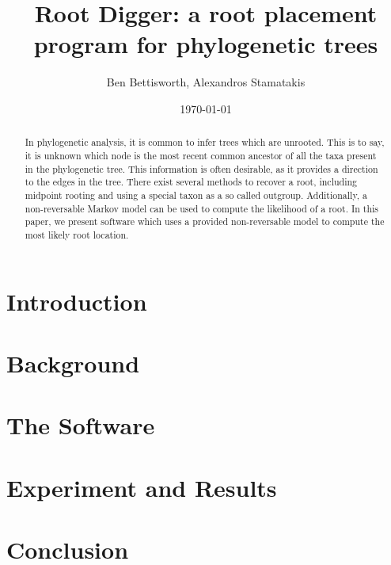 \documentclass{article}
\title{Root Digger: a root placement program for phylogenetic trees}
\author{Ben Bettisworth, Alexandros Stamatakis}
\date{\today}
\begin{document}
\begin{abstract}
In phylogenetic analysis, it is common to infer trees which are unrooted. This
is to say, it is unknown which node is the most recent common ancestor of all
the taxa present in the phylogenetic tree. This information is often desirable,
as it provides a direction to the edges in the tree.  There exist several
methods to recover a root, including midpoint rooting and using a special taxon
as a so called outgroup. Additionally, a non-reversable Markov model can be used
to compute the likelihood of a root. In this paper, we present software which
uses a provided non-reversable model to compute the most likely root location.
\end{abstract}

\maketitle



\section{Introduction}


\section{Background}


\section{The Software}


\section{Experiment and Results}


\section{Conclusion}

\end{document}
